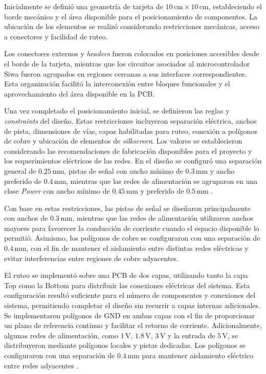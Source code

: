 \documentclass[journal,trans]{IEEEtran}
\begin{document}
Inicialmente se definió una geometría de tarjeta de \(10\,\text{cm} \times 10\,\text{cm}\), estableciendo el borde mecánico y el área disponible para el posicionamiento de componentes. La ubicación de los elementos se realizó considerando restricciones mecánicas, acceso a conectores y facilidad de ruteo.

Los conectores externos y \textit{headers} fueron colocados en posiciones accesibles desde el borde de la tarjeta, mientras que los circuitos asociados al microcontrolador Siwa fueron agrupados en regiones cercanas a sus interfaces correspondientes. Esta organización facilitó la interconexión entre bloques funcionales y el aprovechamiento del área disponible en la PCB.

Una vez completado el posicionamiento inicial, se definieron las reglas y \textit{constraints} del diseño. Estas restricciones incluyeron separación eléctrica, anchos de pista, dimensiones de vías, capas habilitadas para ruteo, conexión a polígonos de cobre y ubicación de elementos de \textit{silkscreen}. Los valores se establecieron considerando las recomendaciones de fabricación disponibles para el proyecto y los requerimientos eléctricos de las redes. En el diseño se configuró una separación general de \(0.25\,\text{mm}\), pistas de señal con ancho mínimo de \(0.3\,\text{mm}\) y ancho preferido de \(0.4\,\text{mm}\), mientras que las redes de alimentación se agruparon en una clase \textit{Power} con ancho mínimo de \(0.45\,\text{mm}\) y preferido de \(0.5\,\text{mm}\) \cite{ipc2221}.

Con base en estas restricciones, las pistas de señal se diseñaron principalmente con anchos de \(0.3\,\text{mm}\), mientras que las redes de alimentación utilizaron anchos mayores para favorecer la conducción de corriente cuando el espacio disponible lo permitió. Asimismo, los polígonos de cobre se configuraron con una separación de \(0.4\,\text{mm}\), con el fin de mantener el aislamiento entre distintas redes eléctricas y evitar interferencias entre regiones de cobre adyacentes.

El ruteo se implementó sobre una PCB de dos capas, utilizando tanto la capa Top como la Bottom para distribuir las conexiones eléctricas del sistema. Esta configuración resultó suficiente para el número de componentes y conexiones del sistema, permitiendo completar el diseño sin recurrir a capas internas adicionales. Se implementaron polígonos de GND en ambas capas con el fin de proporcionar un plano de referencia continuo y facilitar el retorno de corriente. Adicionalmente, algunas redes de alimentación, como \(1\,\mathrm{V}\), \(1.8\,\mathrm{V}\), \(3\,\mathrm{V}\) y la entrada de \(5\,\mathrm{V}\), se distribuyeron mediante polígonos locales y pistas dedicadas. Los polígonos se configuraron con una separación de \(0.4\,\text{mm}\) para mantener aislamiento eléctrico entre redes adyacentes \cite{johnson2003}.
\end{document}
